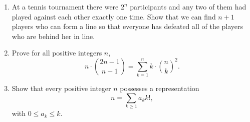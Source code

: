 \documentclass[11pt]{article}
\begin{document}
\begin{enumerate}



\item At a tennis tournament there were $2^n$ participants and any two of them had played against each other exactly one time.  Show that we can find $n+1$ players who can form a line so that everyone has defeated all of the players who are behind her in line.

\item Prove for all positive integers $n$,
\[
n\cdot \binom{2n-1}{n-1} = \sum_{k=1}^n k \cdot \binom{n}{k}^2.
\]

\item Show that every positive integer $n$ possesses a representation 
\[
n = \sum_{k\ge 1} a_k k!,
\]
with $0 \le a_k \le k$.









\end{enumerate}
\end{document}
